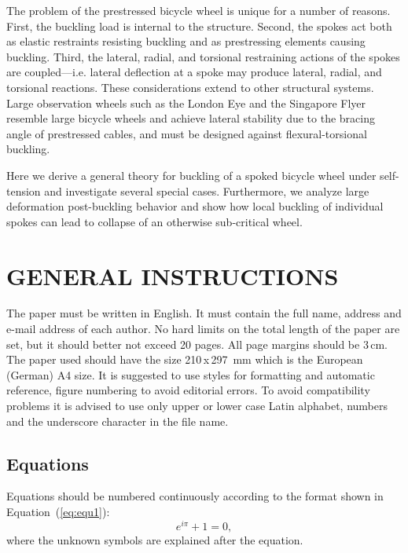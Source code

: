 \documentclass{bmd2016p}
\begin{document}
The problem of the prestressed bicycle wheel is unique for a number of reasons. First, the buckling load is internal to the structure. Second, the spokes act both as elastic restraints resisting buckling and as prestressing elements causing buckling. Third, the lateral, radial, and torsional restraining actions of the spokes are coupled---i.e. lateral deflection at a spoke may produce lateral, radial, and torsional reactions. These considerations extend to other structural systems. Large observation wheels such as the London Eye\cite{Mann2001a} and the Singapore Flyer\cite{Allsop2009a} resemble large bicycle wheels and achieve lateral stability due to the bracing angle of prestressed cables, and must be designed against flexural-torsional buckling.

Here we derive a general theory for buckling of a spoked bicycle wheel under self-tension and investigate several special cases. Furthermore, we analyze large deformation post-buckling behavior and show how local buckling of individual spokes can lead to collapse of an otherwise sub-critical wheel.


\section{GENERAL INSTRUCTIONS}

The paper must be written in English. It must contain the full name, address 
and e-mail address of each author. No hard limits on the total length of the 
paper are set, but it should better not exceed 20 pages. All page margins 
should be 3\,cm. The paper used should have the size 210\,x\,297\, mm 
which is the European (German) A4 size. It is suggested to use styles for 
formatting and automatic reference, figure numbering to avoid editorial 
errors. To avoid compatibility problems it is advised to use only upper or 
lower case Latin alphabet, numbers and the underscore character in the file 
name.


\subsection{Equations}

Equations should be numbered continuously according to the format shown in 
Equation~(\ref{eq:equ1}): 
\begin{equation} \label{eq:equ1}
  e^{i\pi} + 1 = 0, 
\end{equation}
where the unknown symbols are explained after the equation.
\end{document}
